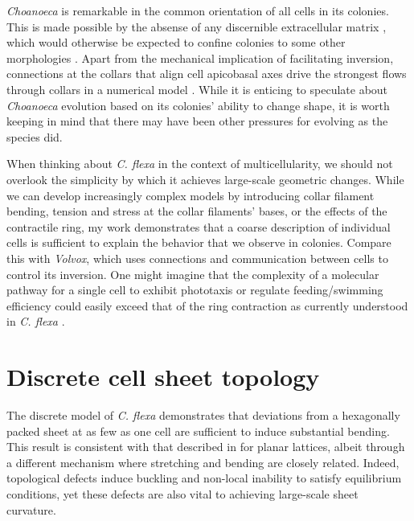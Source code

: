 \textit{Choanoeca} is remarkable in the common orientation of all cells in its colonies. 
This is made possible by the absense of any discernible extracellular matrix \citep{leadbeater1983,brunet2019}, which would otherwise be expected to confine colonies to some other morphologies \citep{larson2020}. 
Apart from the mechanical implication of facilitating inversion, connections at the collars that align cell apicobasal axes drive the strongest flows through collars in a numerical model \citep{kirkegaard2016}. 
While it is enticing to speculate about \textit{Choanoeca} evolution based on its colonies' ability to change shape, it is worth keeping in mind that there may have been other pressures for evolving as the species did.

When thinking about \textit{C. flexa} in the context of multicellularity, we should not overlook the simplicity by which it achieves large-scale geometric changes. 
While we can develop increasingly complex models by introducing collar filament bending, tension and stress at the collar filaments' bases, or the effects of the contractile ring, my work demonstrates that a coarse description of individual cells is sufficient to explain the behavior that we observe in colonies. 
Compare this with \textit{Volvox}, which uses connections and communication between cells to control its inversion. 
One might imagine that the complexity of a molecular pathway for a single cell to exhibit phototaxis or regulate feeding/swimming efficiency could easily exceed that of the ring contraction as currently understood in \textit{C. flexa} \citep{brunet2019}. 

\section{Discrete cell sheet topology}

The discrete model of \textit{C. flexa} demonstrates that deviations from a hexagonally packed sheet at as few as one cell are sufficient to induce substantial bending.
This result is consistent with that described in \citet{seung1988} for planar lattices, albeit through a different mechanism where stretching and bending are closely related.
Indeed, topological defects induce buckling and non-local inability to satisfy equilibrium conditions, yet these defects are also vital to achieving large-scale sheet curvature.

